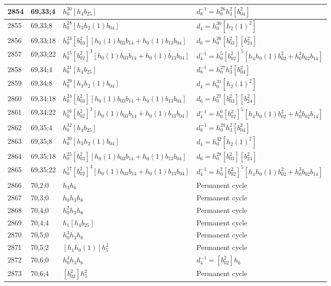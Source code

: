\documentclass{article}
\begin{document}
\begin{longtable}{|l|l|>{\raggedright\arraybackslash}p{6cm}|>{\raggedright\arraybackslash}p{6cm}|}
\hline
2854 & 69,33;4 & $h_0^{30}[h_4b_{25}]$ & $d_{8}^{-1}=h_0^{26}h_3^2[b_{04}^2]$\\
\hline
2855 & 69,33;8 & $h_0^{28}[h_3h_2(1)b_{04}]$ &$d_{4}=h_0^{30}[h_2(1)^2]$\\
\hline
2856 & 69,33;18 & $h_0^{23}[b_{03}^2][h_0(1)b_{03}b_{14} + h_0(1)b_{13}b_{04}]$ &$d_{6}=h_0^{26}[b_{03}^2][b_{24}^2]$\\
\hline
2857 & 69,33;22 & $h_0^{15}[b_{02}^2]^3[h_0(1)b_{03}b_{14} + h_0(1)b_{13}b_{04}]$ & $d_{4}^{-1}=h_0^5[b_{02}^2]^5[h_4h_0(1)b_{02}^2 + h_0^3b_{02}b_{14}]$\\
\hline
2858 & 69,34;4 & $h_0^{31}[h_4b_{25}]$ & $d_{8}^{-1}=h_0^{27}h_3^2[b_{04}^2]$\\
\hline
2859 & 69,34;8 & $h_0^{29}[h_3h_2(1)b_{04}]$ &$d_{4}=h_0^{31}[h_2(1)^2]$\\
\hline
2860 & 69,34;18 & $h_0^{24}[b_{03}^2][h_0(1)b_{03}b_{14} + h_0(1)b_{13}b_{04}]$ &$d_{6}=h_0^{27}[b_{03}^2][b_{24}^2]$\\
\hline
2861 & 69,34;22 & $h_0^{16}[b_{02}^2]^3[h_0(1)b_{03}b_{14} + h_0(1)b_{13}b_{04}]$ & $d_{4}^{-1}=h_0^6[b_{02}^2]^5[h_4h_0(1)b_{02}^2 + h_0^3b_{02}b_{14}]$\\
\hline
2862 & 69,35;4 & $h_0^{32}[h_4b_{25}]$ & $d_{8}^{-1}=h_0^{28}h_3^2[b_{04}^2]$\\
\hline
2863 & 69,35;8 & $h_0^{30}[h_3h_2(1)b_{04}]$ &$d_{4}=h_0^{32}[h_2(1)^2]$\\
\hline
2864 & 69,35;18 & $h_0^{25}[b_{03}^2][h_0(1)b_{03}b_{14} + h_0(1)b_{13}b_{04}]$ &$d_{6}=h_0^{28}[b_{03}^2][b_{24}^2]$\\
\hline
2865 & 69,35;22 & $h_0^{17}[b_{02}^2]^3[h_0(1)b_{03}b_{14} + h_0(1)b_{13}b_{04}]$ & $d_{4}^{-1}=h_0^7[b_{02}^2]^5[h_4h_0(1)b_{02}^2 + h_0^3b_{02}b_{14}]$\\
\hline
2866 & 70,2;0 & $h_3h_6$ & Permanent cycle\\
\hline
2867 & 70,3;0 & $h_0h_3h_6$ & Permanent cycle\\
\hline
2868 & 70,4;0 & $h_0^2h_3h_6$ & Permanent cycle\\
\hline
2869 & 70,4;4 & $h_1[h_4b_{25}]$ & Permanent cycle\\
\hline
2870 & 70,5;0 & $h_0^3h_3h_6$ & Permanent cycle\\
\hline
2871 & 70,5;2 & $[h_1h_0(1)]h_5^2$ & Permanent cycle\\
\hline
2872 & 70,6;0 & $h_0^4h_3h_6$ & $d_{4}^{-1}=[b_{02}^2]h_6$\\
\hline
2873 & 70,6;4 & $[b_{02}^2]h_5^2$ & Permanent cycle\\

\end{longtable}
\end{document}
